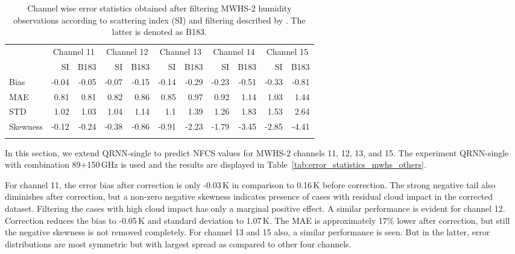 \documentclass[amt, manuscript]{copernicus}
\begin{document}
\begin{table}[t]
	\caption{Channel wise error statistics obtained after filtering MWHS-2 humidity observations  according to scattering index (SI) and filtering described by \citet{buehler:aclou:07}. The latter is denoted as  B183. }
	\label{tab:SI_statistics}
	\begin{tabular}{lrr|rr|rr|rr|rr}
		\tophline
		& \multicolumn{2}{c|}{Channel 11} & \multicolumn{2}{c|}{Channel 12} & \multicolumn{2}{c|}{Channel 13} & \multicolumn{2}{c|}{Channel 14} & \multicolumn{2}{c}{Channel 15}\\
			& SI & B183 & SI & B183 & SI & B183 & SI & B183 & SI & B183\\
			\cline{2-11}
		Bias 	 &-0.04	& -0.05	& -0.07 &  -0.15 &  -0.14 & -0.29	&-0.23 &  -0.51 & -0.33 &  -0.81\\
		MAE  	 & 0.81	&  0.81	&  0.82 &	0.86 &	 0.85 &  0.97   & 0.92 &   1.14 &  1.03 &	1.44\\
		STD  	 &1.02	&  1.03	&  1.04 &	1.14 &	 1.1  &  1.39	& 1.26 &   1.83 &  1.53 &	2.64\\
		Skewness &-0.12 & -0.24 & -0.38 & -0.86  &  -0.91 & -2.23   &-1.79 &  -3.45 & -2.85 &  -4.41\\
		\bottomhline		
	\end{tabular}
\end{table}

In this section, we extend QRNN-single to predict NFCS values for MWHS-2 channels 11, 12, 13, and 15. The experiment QRNN-single with combination 89+150\,GHz is used and the results are displayed in Table~\ref{tab:error_statistics_mwhs_others}.

For channel 11, the error bias after correction is only -0.03\,K in comparison to 0.16\,K before correction. The strong negative tail also diminishes after correction, but a non-zero negative skewness indicates presence of cases with residual cloud impact in the corrected dataset. Filtering the cases with high cloud impact has only a marginal positive effect. A similar performance is evident for channel 12. Correction reduces the bias to -0.05\,K and standard deviation to 1.07\,K. The MAE is approximately 17\% lower after correction, but still the negative skewness is not removed completely. For channel 13 and 15 also, a similar performance is seen. But in the latter, error distributions are most symmetric but with largest spread as compared to other four channels.
\end{document}
